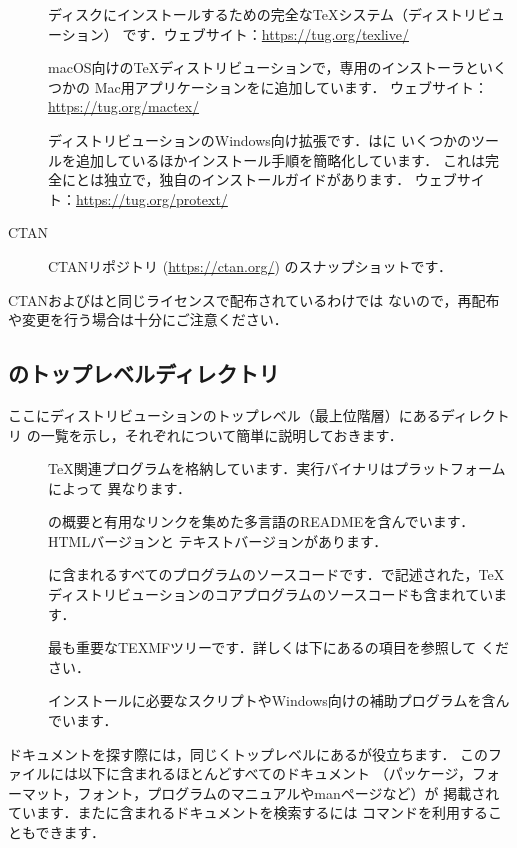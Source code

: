\documentclass[uplatex,dvipdfmx,tombow]{jsarticle}
\begin{document}
\begin{description}
\item[\TL]
ディスクにインストールするための完全な\TeX システム（ディストリビューション）
です．ウェブサイト：\url{https://tug.org/texlive/}

\item[\MacTeX]
macOS向けの\TeX ディストリビューションで，専用のインストーラといくつかの
Mac用アプリケーションを\TL に追加しています．
ウェブサイト：\url{https://tug.org/mactex/}

\item[\ProTeXt]
\MIKTEX ディストリビューションのWindows向け拡張です．\ProTeXt は\MIKTEX に
いくつかのツールを追加しているほかインストール手順を簡略化しています．
これは完全に\TL とは独立で，独自のインストールガイドがあります．
ウェブサイト：\url{https://tug.org/protext/}

\item[CTAN]
CTANリポジトリ (\url{https://ctan.org/}) のスナップショットです．
\end{description}

CTANおよびは\TL と同じライセンスで配布されているわけでは
ないので，再配布や変更を行う場合は十分にご注意ください．

\subsection{\TL のトップレベルディレクトリ}
\label{sec:tld}

ここに\TL ディストリビューションのトップレベル（最上位階層）にあるディレクトリ
の一覧を示し，それぞれについて簡単に説明しておきます．
%
\begin{description}
\item[]
\TeX 関連プログラムを格納しています．実行バイナリはプラットフォームによって
異なります．

\item[]
\TL の概要と有用なリンクを集めた多言語のREADMEを含んでいます．HTMLバージョンと
テキストバージョンがあります．

\item[]
\TL に含まれるすべてのプログラムのソースコードです．\Webc で記述された，\TeX
ディストリビューションのコアプログラムのソースコードも含まれています．

\item[]
最も重要なTEXMFツリーです．詳しくは下にあるの項目を参照して
ください．

\item[]
インストールに必要なスクリプトやWindows向けの補助プログラムを含んでいます．
\end{description}
%
%
ドキュメントを探す際には，同じくトップレベルにあるが役立ちます．
このファイルには以下に含まれるほとんどすべてのドキュメント
（パッケージ，フォーマット，フォント，プログラムのマニュアルやmanページなど）が
掲載されています．また\TL に含まれるドキュメントを検索するには%
コマンドを利用することもできます．
\end{document}
